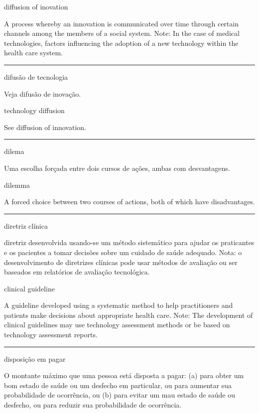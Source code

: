 \documentclass[
  openany]{book}
\begin{document}
diffusion of inovation

A process whereby an innovation is communicated over time through certain channels among the members of a social system. Note: In the case of medical technologies, factors influencing the adoption of a new technology within the health care system.

\begin{center}\rule{0.5\linewidth}{0.5pt}\end{center}

difusão de tecnologia

Veja difusão de inovação.

technology diffusion

See diffusion of innovation.

\begin{center}\rule{0.5\linewidth}{0.5pt}\end{center}

dilema

Uma escolha forçada entre dois cursos de ações, ambas com desvantagens.

dilemma

A forced choice between two courses of actions, both of which have disadvantages.

\begin{center}\rule{0.5\linewidth}{0.5pt}\end{center}

diretriz clínica

diretriz desenvolvida usando-se um método sistemático para ajudar os praticantes e os pacientes a tomar decisões sobre um cuidado de saúde adequado. Nota: o desenvolvimento de diretrizes clínicas pode usar métodos de avaliação ou ser baseados em relatórios de avaliação tecnológica.

clinical guideline

A guideline developed using a systematic method to help practitioners and patients make decisions about appropriate health care. Note: The development of clinical guidelines may use technology assessment methods or be based on technology assessment reports.

\begin{center}\rule{0.5\linewidth}{0.5pt}\end{center}

disposição em pagar

O montante máximo que uma pessoa está disposta a pagar: (a) para obter um bom estado de saúde ou um desfecho em particular, ou para aumentar sua probabilidade de ocorrência, ou (b) para evitar um mau estado de saúde ou desfecho, ou para reduzir sua probabilidade de ocorrência.
\end{document}
